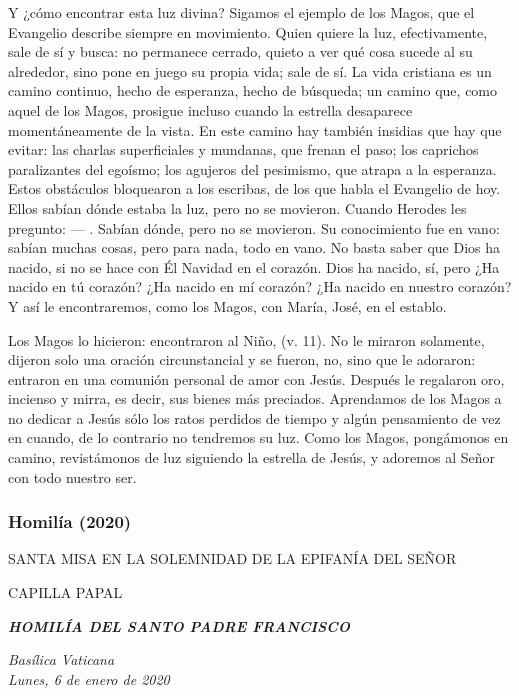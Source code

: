 Y ¿cómo encontrar esta luz divina? Sigamos el ejemplo de los Magos, que el Evangelio describe siempre en movimiento. Quien quiere la luz, efectivamente, sale de sí y busca: no permanece cerrado, quieto a ver qué cosa sucede al su alrededor, sino pone en juego su propia vida; sale de sí. La vida cristiana es un camino continuo, hecho de esperanza, hecho de búsqueda; un camino que, como aquel de los Magos, prosigue incluso cuando la estrella desaparece momentáneamente de la vista. En este camino hay también insidias que hay que evitar: las charlas superficiales y mundanas, que frenan el paso; los caprichos paralizantes del egoísmo; los agujeros del pesimismo, que atrapa a la esperanza. Estos obstáculos bloquearon a los escribas, de los que habla el Evangelio de hoy. Ellos sabían dónde estaba la luz, pero no se movieron. Cuando Herodes les pregunto:  --- . Sabían dónde, pero no se movieron. Su conocimiento fue en vano: sabían muchas cosas, pero para nada, todo en vano. No basta saber que Dios ha nacido, si no se hace con Él Navidad en el corazón. Dios ha nacido, sí, pero ¿Ha nacido en tú corazón? ¿Ha nacido en mí corazón? ¿Ha nacido en nuestro corazón? Y así le encontraremos, como los Magos, con María, José, en el establo.

Los Magos lo hicieron: encontraron al Niño,  (v. 11). No le miraron solamente, dijeron solo una oración circunstancial y se fueron, no, sino que le adoraron: entraron en una comunión personal de amor con Jesús. Después le regalaron oro, incienso y mirra, es decir, sus bienes más preciados. Aprendamos de los Magos a no dedicar a Jesús sólo los ratos perdidos de tiempo y algún pensamiento de vez en cuando, de lo contrario no tendremos su luz. Como los Magos, pongámonos en camino, revistámonos de luz siguiendo la estrella de Jesús, y adoremos al Señor con todo nuestro ser.

\subsubsection{Homilía (2020)} {SANTA MISA EN LA SOLEMNIDAD DE LA EPIFANÍA DEL SEÑOR}

CAPILLA PAPAL

\textbf{\emph{HOMILÍA DEL SANTO PADRE FRANCISCO}}

\emph{Basílica Vaticana\\ Lunes, 6 de enero de 2020}

~


